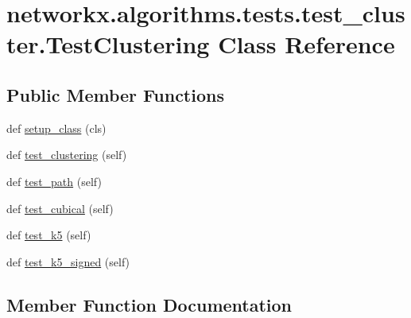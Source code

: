 \hypertarget{classnetworkx_1_1algorithms_1_1tests_1_1test__cluster_1_1TestClustering}{}\section{networkx.\+algorithms.\+tests.\+test\+\_\+cluster.\+Test\+Clustering Class Reference}
\label{classnetworkx_1_1algorithms_1_1tests_1_1test__cluster_1_1TestClustering}
\subsection*{Public Member Functions}
\begin{DoxyCompactItemize}
\item 
def \hyperlink{classnetworkx_1_1algorithms_1_1tests_1_1test__cluster_1_1TestClustering_a4f596dbebb4766662c3c5f10ae289a08}{setup\+\_\+class} (cls)
\item 
def \hyperlink{classnetworkx_1_1algorithms_1_1tests_1_1test__cluster_1_1TestClustering_a34cdb7bb31fca2cb66509e8e70646dda}{test\+\_\+clustering} (self)
\item 
def \hyperlink{classnetworkx_1_1algorithms_1_1tests_1_1test__cluster_1_1TestClustering_aa2ffb94a87fef6066ab0062882471f8a}{test\+\_\+path} (self)
\item 
def \hyperlink{classnetworkx_1_1algorithms_1_1tests_1_1test__cluster_1_1TestClustering_a60b39da9b2981e12ffab45b44f327978}{test\+\_\+cubical} (self)
\item 
def \hyperlink{classnetworkx_1_1algorithms_1_1tests_1_1test__cluster_1_1TestClustering_ae4c0ba1d45621fdbb9292f7bb42ceddb}{test\+\_\+k5} (self)
\item 
def \hyperlink{classnetworkx_1_1algorithms_1_1tests_1_1test__cluster_1_1TestClustering_a1672e765a91e86c43fbedd28cced68c5}{test\+\_\+k5\+\_\+signed} (self)
\end{DoxyCompactItemize}


\subsection{Member Function Documentation}
\mbox{\label{classnetworkx_1_1algorithms_1_1tests_1_1test__cluster_1_1TestClustering_a4f596dbebb4766662c3c5f10ae289a08}} 
